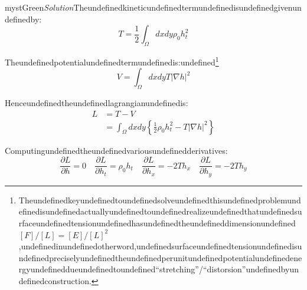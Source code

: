 \begin{mystadmonition}{mystGreen}{\emph{Solution}}Theundefinedkineticundefinedtermundefinedisundefinedgivenundefinedby:
\begin{equation}
T=\frac12 \int_{\Omega} dxdy \rho_0h_t^2
\end{equation}

Theundefinedpotentialundefinedtermundefinedis:undefined\footnote{Theundefinedkeyundefinedtoundefinedsolveundefinedthisundefinedproblemundefinedisundefinedactuallyundefinedtoundefinedrealizeundefinedthatundefinedsurfaceundefinedtensionundefinedhasundefinedtheundefineddimensionundefined$[F]/[L]=[E]/[L]^2$,undefinedinundefinedotherword,undefinedsurfaceundefinedtensionundefinedisundefinedpreciselyundefinedtheundefinedperunitundefinedpotentialundefinedenergyundefineddueundefinedtoundefined``stretching''/``distorsion''undefinedbyundefinedconstruction.}
\begin{equation}
V=\int_{\Omega} dxdy T|\nabla h|^2
\end{equation}

Henceundefinedtheundefinedlagrangianundefinedis:
\begin{equation}
\begin{aligned}
L &= T-V \\
&= \int_{\Omega} dxdy \left\{\frac12 \rho_0h_t^2 - T|\nabla h|^2 \right\}
\end{aligned}
\end{equation}

Computingundefinedtheundefinedvariousundefinedderivatives:
\begin{equation}
\frac{\partial L}{\partial h}=0 \quad \frac{\partial L}{\partial h_t}=\rho_0 h_t \quad \frac{\partial L}{\partial h_x}=-2Th_{x} \quad \frac{\partial L}{\partial h_y}=-2Th_{y}
\end{equation}

\end{mystadmonition}